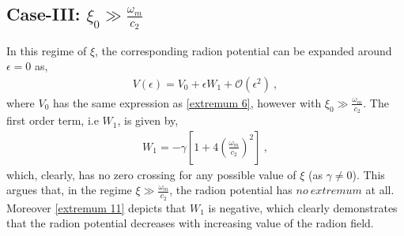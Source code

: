 \documentclass{article}
\begin{document}
\subsection*{Case-III: $\xi_\mathrm{0} \gg \frac{\omega_m}{c_2}$}
In this regime of $\xi$, the corresponding radion potential can be 
expanded around $\epsilon = 0$ as,
\begin{eqnarray}
 V(\epsilon) = V_\mathrm{0} + \epsilon W_\mathrm{1} + \mathcal{O}\left(\epsilon^2\right)~,
 \label{extremum 10}
\end{eqnarray}
where $V_\mathrm{0}$ has the same expression as \ref{extremum 6}, however with $\xi_\mathrm{0} \gg \frac{\omega_m}{c_2}$. The first order term, i.e 
$W_\mathrm{1}$, is given by,
\begin{eqnarray}
 W_\mathrm{1} = -\gamma\left[1 + 4\left(\frac{\omega_m}{c_2}\right)^2\right]~,
 \label{extremum 11}
\end{eqnarray}
which, clearly, has no zero crossing for any possible value of $\xi$ (as $\gamma \neq 0$). This argues that, in the regime 
$\xi \gg \frac{\omega_m}{c_2}$, the radion potential has $no~extremum$ at all. Moreover \ref{extremum 11} depicts that 
$W_\mathrm{1}$ is negative, which clearly demonstrates that the radion potential decreases with increasing value of the radion field.







\end{document}
